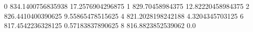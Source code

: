 0 834.1400756835938 17.2576904296875
1 829.70458984375 12.82220458984375
2 826.4410400390625 9.55865478515625
4 821.2028198242188 4.3204345703125
6 817.4542236328125 0.57183837890625
8 816.8823852539062 0.0
